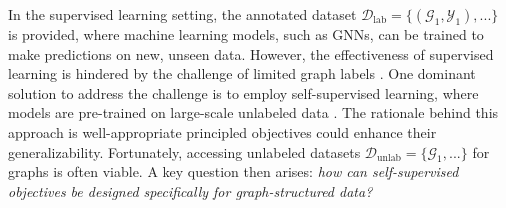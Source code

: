 \documentclass[11pt]{article}
\begin{document}
In the supervised learning setting, the annotated dataset $\mathcal{D}_\mathrm{lab} = \{(\mathcal{G}_1, \mathcal{Y}_1), ...\}$ is provided, where machine learning models, such as GNNs, can be trained to make predictions on new, unseen data. However, the effectiveness of supervised learning is hindered by the challenge of limited graph labels \cite{mitchell2007machine}. One dominant solution to address the challenge is to employ self-supervised learning, where models are pre-trained on large-scale unlabeled data \cite{chen2020simple, devlin2018bert}. The rationale behind this approach is well-appropriate principled objectives could enhance their generalizability. Fortunately, accessing unlabeled datasets $\mathcal{D}_\mathrm{unlab} = \{\mathcal{G}_1, ...\}$ for graphs is often viable. A key question then arises: \textit{how can self-supervised objectives be designed specifically for graph-structured data?}
\end{document}
